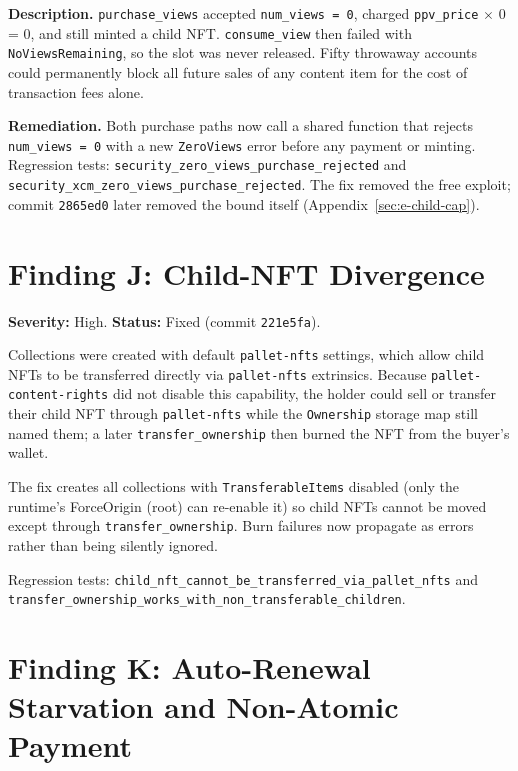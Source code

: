 \textbf{Description.} \texttt{purchase\_views} accepted \texttt{num\_views = 0}, charged \texttt{ppv\_price} $\times$ 0 = 0, and still minted a child NFT. \texttt{consume\_view} then failed with \texttt{NoViewsRemaining}, so the slot was never released. Fifty throwaway accounts could permanently block all future sales of any content item for the cost of transaction fees alone.

\textbf{Remediation.} Both purchase paths now call a shared function that rejects \texttt{num\_views = 0} with a new \texttt{ZeroViews} error before any payment or minting. Regression tests: \texttt{security\_zero\_views\_purchase\_rejected} and \texttt{security\_xcm\_zero\_views\_purchase\_rejected}. The fix removed the free exploit; commit \texttt{2865ed0} later removed the bound itself (Appendix~\ref{sec:e-child-cap}).

\section[Finding J: Child-NFT Divergence]{Finding J: Child-NFT Divergence}\label{sec:d-finding-j}

\textbf{Severity:} High. \textbf{Status:} Fixed (commit \texttt{221e5fa}).

Collections were created with default \texttt{pallet-nfts} settings, which allow child NFTs to be transferred directly via \texttt{pallet-nfts} extrinsics. Because \texttt{pallet-content-rights} did not disable this capability, the holder could sell or transfer their child NFT through \texttt{pallet-nfts} while the \texttt{Ownership} storage map still named them; a later \texttt{transfer\_ownership} then burned the NFT from the buyer's wallet.

The fix creates all collections with \texttt{TransferableItems} disabled (only the runtime's ForceOrigin (root) can re-enable it) so child NFTs cannot be moved except through \texttt{transfer\_ownership}. Burn failures now propagate as errors rather than being silently ignored.

Regression tests: \texttt{child\_nft\_cannot\_be\_transferred\_via\_pallet\_nfts} and \texttt{transfer\_ownership\_works\_with\_non\_transferable\_children}.

\section[Finding K: Auto-Renewal Starvation]{Finding K: Auto-Renewal Starvation and Non-Atomic Payment}\label{sec:d-finding-k}

